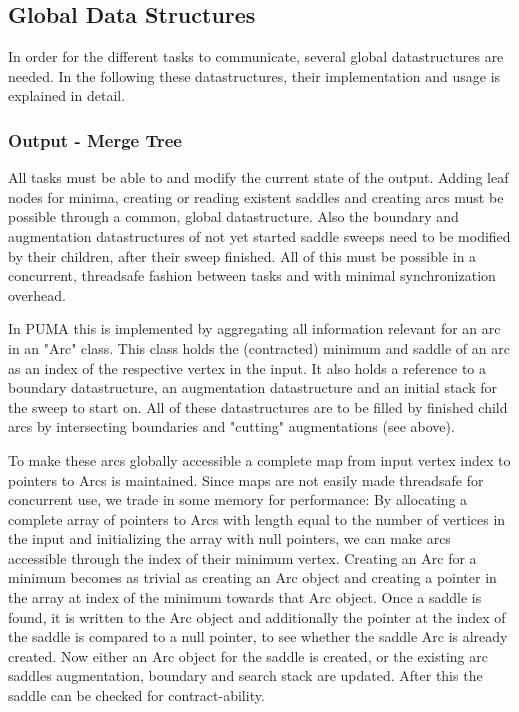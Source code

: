 \documentclass{scrartcl}
\begin{document}
\subsection{Global Data Structures}
In order for the different tasks to communicate, several global datastructures are needed. In the following these datastructures, their implementation and usage is explained in detail.

\subsubsection{Output - Merge Tree}
All tasks must be able to  and modify the current state of the output. Adding leaf nodes for minima, creating or reading existent saddles and creating arcs must be possible through a common, global datastructure. Also the boundary and augmentation datastructures of not yet started saddle sweeps need to be modified by their children, after their sweep finished. All of this must be possible in a concurrent, threadsafe fashion between tasks and with minimal synchronization overhead.

In PUMA this is implemented by aggregating all information relevant for an arc in an "Arc" class. This class holds the (contracted) minimum and saddle of an arc as an index of the respective vertex in the input. It also holds a reference to a boundary datastructure, an augmentation datastructure and an initial stack for the sweep to start on. All of these datastructures are to be filled by finished child arcs by intersecting boundaries and "cutting" augmentations (see above).

To make these arcs globally accessible a complete map from input vertex index to pointers to Arcs is maintained. Since maps are not easily made threadsafe for concurrent use, we trade in some memory for performance: By allocating a complete array of pointers to Arcs with length equal to the number of vertices in the input and initializing the array with null pointers, we can make arcs accessible through the index of their minimum vertex. Creating an Arc for a minimum becomes as trivial as creating an Arc object and creating a pointer in the array at index of the minimum towards that Arc object. Once a saddle is found, it is written to the Arc object and additionally the pointer at the index of the saddle is compared to a null pointer, to see whether the saddle Arc is already created. Now either an Arc object for the saddle is created, or the existing arc saddles augmentation, boundary and search stack are updated. After this the saddle can be checked for contract-ability.
\end{document}
